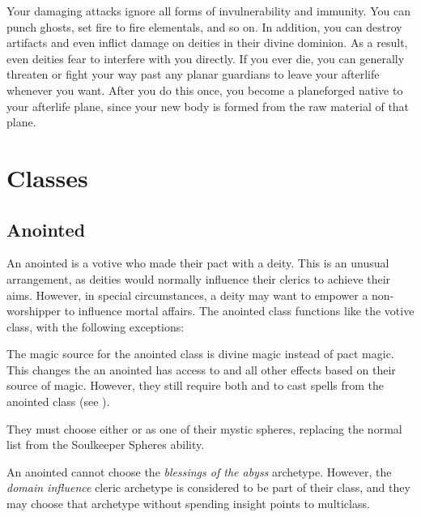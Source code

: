       Your damaging attacks ignore all forms of invulnerability and immunity.
      You can punch ghosts, set fire to fire elementals, and so on.
      In addition, you can destroy artifacts and even inflict damage on deities in their divine dominion.
      As a result, even deities fear to interfere with you directly.
      If you ever die, you can generally threaten or fight your way past any planar guardians to leave your afterlife whenever you want.
      After you do this once, you become a planeforged native to your afterlife plane, since your new body is formed from the raw material of that plane.

\section{Classes}
  \subsection{Anointed}
    An anointed is a votive who made their pact with a deity.
    This is an unusual arrangement, as deities would normally influence their clerics to achieve their aims.
    However, in special circumstances, a deity may want to empower a non-worshipper to influence mortal affairs.
    The anointed class functions like the votive class, with the following exceptions:
    \begin{raggeditemize}
      \item The magic source for the anointed class is divine magic instead of pact magic.
        This changes the  an anointed has access to and all other effects based on their source of magic.
        However, they still require both  and  to cast spells from the anointed class (see ).
      \item They must choose either  or  as one of their mystic spheres, replacing the normal list from the Soulkeeper Spheres ability.
      \item An anointed cannot choose the \textit{blessings of the abyss} archetype. However, the \textit{domain influence} cleric archetype is considered to be part of their class, and they may choose that archetype without spending insight points to multiclass.
    \end{raggeditemize}

